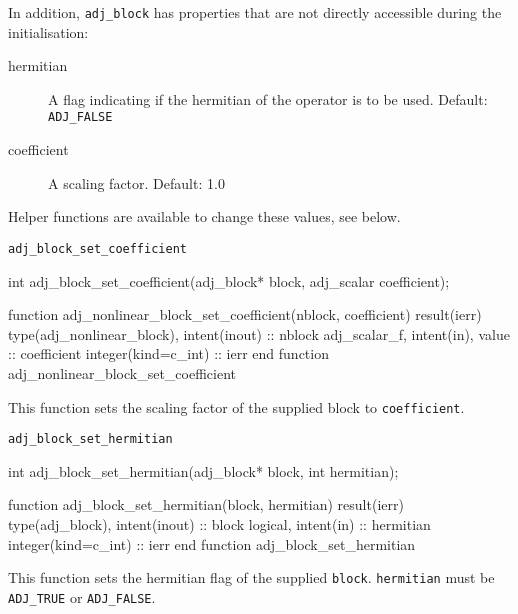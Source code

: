 In addition, \texttt{adj_block} has properties that are not directly accessible during the initialisation:

\begin{description}
  \item[hermitian] A flag indicating if the hermitian of the operator is to be used. Default: \texttt{ADJ_FALSE}
  \item[coefficient] A scaling factor. Default: 1.0
\end{description}

Helper functions are available to change these values, see below. 


\begin{boxwithtitle}{\texttt{adj_block_set_coefficient}}
\begin{minipage}{\columnwidth}
\begin{ccode}
  int adj_block_set_coefficient(adj_block* block, adj_scalar coefficient);
\end{ccode}
\begin{fortrancode}
  function adj_nonlinear_block_set_coefficient(nblock, coefficient) result(ierr)
    type(adj_nonlinear_block), intent(inout) :: nblock
    adj_scalar_f, intent(in), value :: coefficient
    integer(kind=c_int) :: ierr
  end function adj_nonlinear_block_set_coefficient
\end{fortrancode}
\end{minipage}
\end{boxwithtitle}

This function sets the scaling factor of the supplied block to \texttt{coefficient}. 


\begin{boxwithtitle}{\texttt{adj_block_set_hermitian}}
\begin{minipage}{\columnwidth}
\begin{ccode}
  int adj_block_set_hermitian(adj_block* block, int hermitian);
\end{ccode}
\begin{fortrancode}
  function adj_block_set_hermitian(block, hermitian) result(ierr)
    type(adj_block), intent(inout) :: block
    logical, intent(in) :: hermitian
    integer(kind=c_int) :: ierr
  end function adj_block_set_hermitian
\end{fortrancode}
\end{minipage}
\end{boxwithtitle}

This function sets the hermitian flag of the supplied \texttt{block}. \texttt{hermitian} must be \texttt{ADJ_TRUE} or \texttt{ADJ_FALSE}.

